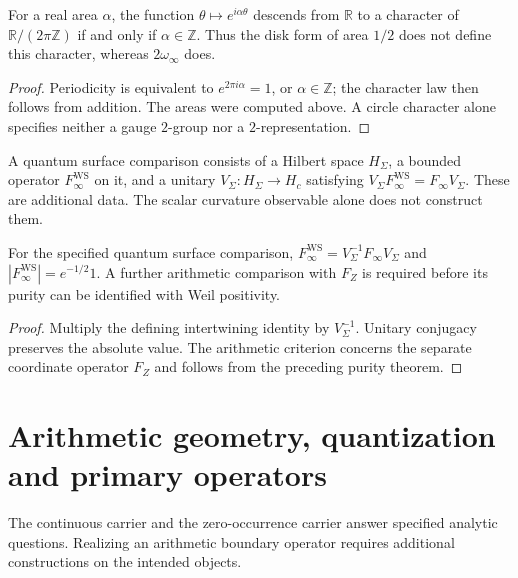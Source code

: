 \begin{proposition}
\label{v4-arith:pres90:area-character}
For a real area $\alpha$, the function $\theta\mapsto e^{i\alpha\theta}$
descends from $\mathbb R$ to a character of $\mathbb R/(2\pi\mathbb Z)$
if and only if $\alpha\in\mathbb Z$. Thus the disk form of area $1/2$
does not define this character, whereas $2\omega_\infty$ does.
\end{proposition}
\begin{proof}
Periodicity is equivalent to $e^{2\pi i\alpha}=1$, or
$\alpha\in\mathbb Z$; the character law then follows from addition.
The areas were computed above. A circle character alone specifies
neither a gauge $2$-group nor a $2$-representation.
\end{proof}

\begin{definition}
\label{v4-arith:w9-r2:def:F-infty-WS}
A quantum surface comparison consists of a Hilbert space $H_\Sigma$,
a bounded operator $F_\infty^{\mathrm{WS}}$ on it, and a unitary
$V_\Sigma:H_\Sigma\to H_c$ satisfying
$V_\Sigma F_\infty^{\mathrm{WS}}=F_\infty V_\Sigma$.
These are additional data. The scalar curvature observable alone
does not construct them.
\end{definition}

\begin{proposition}
\label{v4-arith:w9-r2:thm:WS-equals-scaling}
For the specified quantum surface comparison,
$F_\infty^{\mathrm{WS}}=V_\Sigma^{-1}F_\infty V_\Sigma$ and
$|F_\infty^{\mathrm{WS}}|=e^{-1/2}1$.
A further arithmetic comparison with $F_Z$ is required before its
purity can be identified with Weil positivity.
\end{proposition}
\begin{proof}
Multiply the defining intertwining identity by $V_\Sigma^{-1}$.
Unitary conjugacy preserves the absolute value.
The arithmetic criterion concerns the separate coordinate operator
$F_Z$ and follows from the preceding purity theorem.
\end{proof}

\section{Arithmetic geometry, quantization and primary operators}
\label{v4-arith:pres90:native-questions}

The continuous carrier and the zero-occurrence carrier answer
specified analytic questions. Realizing an arithmetic boundary
operator requires additional constructions on the intended objects.

